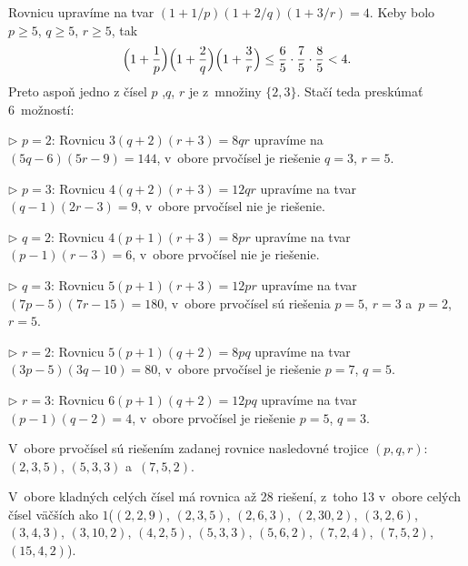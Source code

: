 {\ifrozsirenevzoraky
\ineriesenie
Rovnicu upravíme na tvar $(1+1/p)(1+2/q)(1+3/r)=4$. Keby bolo $p\ge5$, $q\ge5$, $r\ge5$, tak
$$
\Bigl(1+\frac1p\Bigr)\Bigl(1+\frac2q\Bigr)\Bigl(1+\frac3r\Bigr)\le\frac65\cdot\frac75\cdot\frac85<4.
$$
Preto aspoň jedno z čísel $p$ ,$q$, $r$ je z~množiny $\{2,3\}$. Stačí teda preskúmať 6~možností:

\item{$\triangleright$} $p=2$: Rovnicu $3(q+2)(r+3)=8qr$ upravíme na $(5q-6)(5r-9)=144$, v~obore prvočísel je riešenie $q=3$, $r=5$.
\item{$\triangleright$} $p=3$: Rovnicu $4(q+2)(r+3)=12qr$ upravíme na tvar $(q-1)(2r-3)=9$, v~obore prvočísel nie je riešenie.
\item{$\triangleright$} $q=2$: Rovnicu $4(p+1)(r+3)=8pr$ upravíme na tvar $(p-1)(r-3)=6$, v~obore prvočísel nie je riešenie.
\item{$\triangleright$} $q=3$: Rovnicu $5(p+1)(r+3)=12pr$ upravíme na tvar $(7p-5)(7r-15)=180$, v~obore prvočísel sú riešenia $p=5$, $r=3$ a~$p=2$, $r=5$.
\item{$\triangleright$} $r=2$: Rovnicu $5(p+1)(q+2)=8pq$ upravíme na tvar $(3p-5)(3q-10)=80$, v~obore prvočísel je riešenie $p=7$, $q=5$.
\item{$\triangleright$} $r=3$: Rovnicu $6(p+1)(q+2)=12pq$ upravíme na tvar $(p-1)(q-2)=4$, v~obore prvočísel je riešenie $p=5$, $q=3$.

\zaver
V~obore prvočísel sú riešením zadanej rovnice nasledovné trojice $(p,q,r)$: $(2,3,5)$, $(5,3,3)$ a~$(7,5,2)$.
\fi

\poznamka
V~obore kladných celých čísel má rovnica až 28 riešení, z~toho 13 v~obore celých čísel väčších ako $1$\ifrozsirenevzoraky ($(2,2,9)$, $(2, 3, 5)$, $(2, 6, 3)$, $(2, 30, 2)$, $(3, 2, 6)$, $(3, 4, 3)$, $(3, 10, 2)$, $(4, 2, 5)$, $(5, 3, 3)$, $(5, 6, 2)$, $(7, 2, 4)$, $(7, 5, 2)$, $(15, 4, 2)$)\fi.
}

